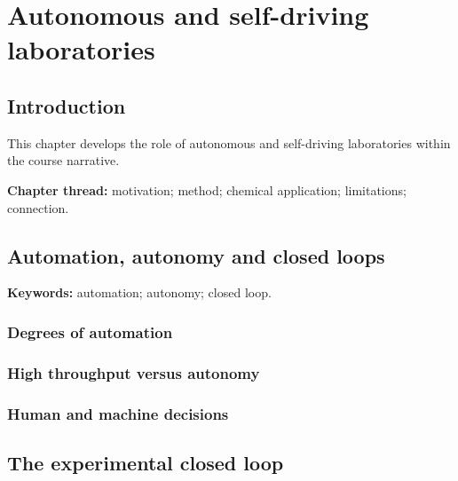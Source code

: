 
\chapter{Autonomous and self-driving laboratories}

\section{Introduction}

This chapter develops the role of autonomous and self-driving laboratories within the course narrative.

\begin{insightbox}
\textbf{Chapter thread:} motivation; method; chemical application; limitations; connection.
\end{insightbox}

\section{Automation, autonomy and closed loops}

\begin{conceptbox}
\textbf{Keywords:} automation; autonomy; closed loop.
\end{conceptbox}

\subsection{Degrees of automation}


\subsection{High throughput versus autonomy}


\subsection{Human and machine decisions}


\section{The experimental closed loop}

